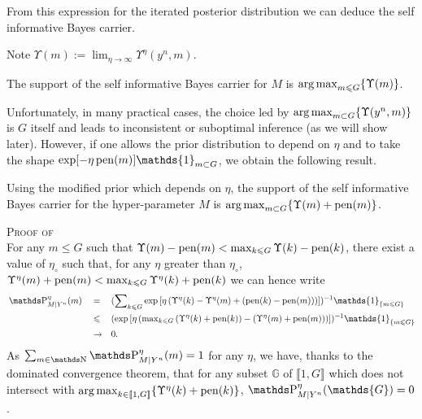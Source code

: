 From this expression for the iterated posterior distribution we can deduce the self informative Bayes carrier.

\begin{lm}\label{LM_BAYES_HIERARCHICAL_LIMIT}
Note $\Upsilon(m) := \lim\nolimits_{\eta \rightarrow \infty} \Upsilon^{\eta}(y^{n}, m)$.

The support of the self informative Bayes carrier for $M$ is $\operatorname*{arg\,max}\nolimits_{m \leqslant G} \{\Upsilon(m)\}$.
\reEnd
\end{lm}

Unfortunately, in many practical cases, the choice led by $\operatorname*{arg\,max}\nolimits_{m \subset G} \{\Upsilon(y^{n}, m)\}$ is $G$ itself and leads to inconsistent or suboptimal inference (as we will show later).
However, if one allows the prior distribution to depend on $\eta$ and to take the shape $\exp[- \eta \pen(m)] \mathds{1}_{m \subset G}$, we obtain the following result.

\begin{thm}\label{THM_BAYES_HIERARCHICAL_LIMITTHRESHOLD}
Using the modified prior which depends on $\eta$, the support of the self informative Bayes carrier for the hyper-parameter $M$ is $\operatorname*{arg\,max}\nolimits_{m \subset G} \{\Upsilon(m) + \operatorname{pen}(m)\}$.
\reEnd
\end{thm}

\begin{pro}{\textsc{Proof of }\\}\label{PRO_BAYES_HIERARCHICAL_THRESHOLD}
For any $m \leq G$ such that $\Upsilon(m) - \operatorname{pen}(m) < \max\nolimits_{k \leqslant G} \Upsilon(k) - \operatorname{pen}(k)$, there exist a value of $\eta_{\circ}$ such that, for any $\eta$ greater than $\eta_{\circ}$, $\Upsilon^{\eta}(m) + \operatorname{pen}(m) < \max\nolimits_{k \leqslant G} \Upsilon^{\eta}(k) + \operatorname{pen}(k)$ we can hence write
\begin{alignat*}{3}
& \P_{M \vert Y^{n}}^{\eta}(m) && = && (\sum\nolimits_{k \leq G}\exp\left[\eta \left(\Upsilon^{\eta}(k) - \Upsilon^{\eta}(m) + \left(\pen(k) - \pen(m)\right)\right)\right])^{-1} \mathds{1}_{\{m \leq G\}}\\
& && \leq && (\exp\left[\eta \left(\max\nolimits_{k \leq G}\left(\Upsilon^{\eta}(k) + \pen(k)\right) - \left(\Upsilon^{\eta}(m) + \pen(m)\right)\right)\right])^{-1} \mathds{1}_{\{m \leq G\}}\\
& && \rightarrow && 0.
\end{alignat*}
As $\sum_{m \in \N} \P_{M \vert Y^{n}}^{\eta}(m) = 1$ for any $\eta$, we have, thanks to the dominated convergence theorem, that for any subset $\mathds{G}$ of $\llbracket 1, G \rrbracket$ which does not intersect with $\operatorname*{arg\,max}_{k \in \llbracket 1, G \rrbracket} \{\Upsilon^{\eta}(k) + \operatorname{pen}(k)\}$, $\P_{M \vert Y^{n}}^{\eta}(\mathds{G}) = 0$.
\proEnd
\end{pro}

